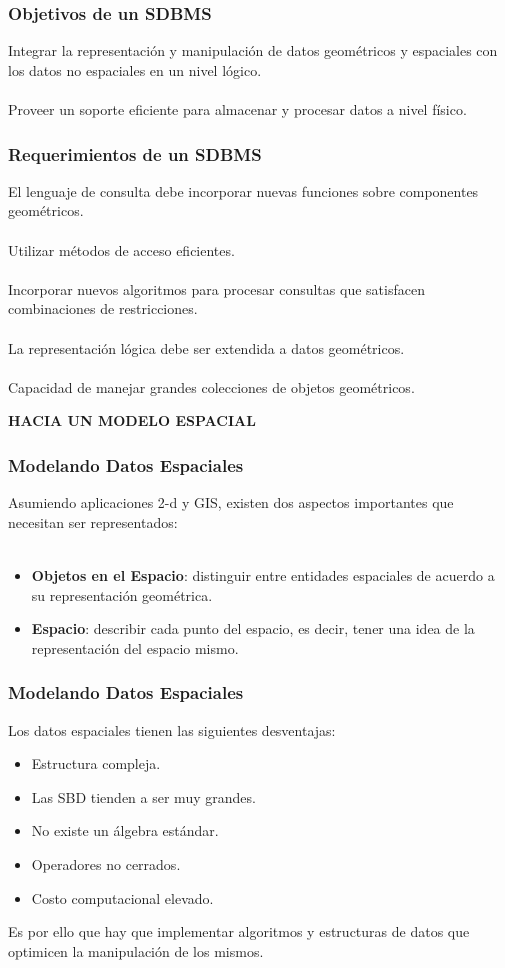 \documentclass[12pt]{beamer}
\begin{document}
\begin{frame}
\frametitle{Objetivos de un SDBMS}
Integrar la representaci\'on y manipulaci\'on de datos geom\'etricos y espaciales con los datos no espaciales en un nivel l\'ogico.\\
\ \\
Proveer un soporte eficiente para almacenar y procesar datos a nivel f\'isico.
\end{frame}

\begin{frame}
\frametitle{Requerimientos de un SDBMS}
El lenguaje de consulta debe incorporar nuevas funciones sobre componentes geom\'etricos.\\
\ \\
Utilizar m\'etodos de acceso eficientes.\\
\ \\
Incorporar nuevos algoritmos para procesar consultas que satisfacen combinaciones de restricciones.\\
\ \\
La representaci\'on l\'ogica debe ser extendida a datos geom\'etricos.\\
\ \\
Capacidad de manejar grandes colecciones de objetos geom\'etricos.
\end{frame}

\begin{frame}
\begin{center}\textbf{HACIA UN MODELO ESPACIAL}
\end{center}
\end{frame}

\begin{frame}
\frametitle{Modelando Datos Espaciales}
Asumiendo aplicaciones 2-d y GIS, existen dos aspectos importantes que necesitan ser representados:\\
\ \\
\begin{itemize}
\item \textbf{Objetos en el Espacio}: distinguir entre entidades espaciales de acuerdo a su representaci\'on geom\'etrica.
\item \textbf{Espacio}: describir cada punto del espacio, es decir, tener una idea de la representaci\'on del espacio mismo.
\end{itemize}
\end{frame}

\begin{frame}
\frametitle{Modelando Datos Espaciales}
Los datos espaciales tienen las siguientes desventajas:
\begin{itemize}
\item Estructura compleja.
\item Las SBD tienden a ser muy grandes.
\item No existe un \'algebra est\'andar.
\item Operadores no cerrados.
\item Costo computacional elevado.
\end{itemize}
Es por ello que hay que implementar algoritmos y estructuras de datos que optimicen la manipulaci\'on de los mismos.
\end{frame}
\end{document}
